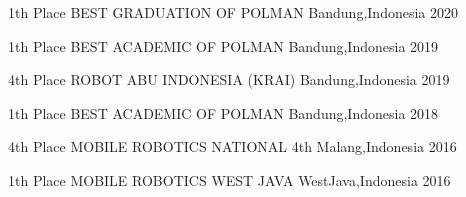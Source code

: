 


\begin{cvhonors}

  \cvhonor
    {1th Place} %
    {BEST GRADUATION OF POLMAN} %
    {Bandung,Indonesia} %
    {2020} %

  \cvhonor
    {1th Place} %
    {BEST ACADEMIC OF POLMAN} %
    {Bandung,Indonesia} %
    {2019} %

  \cvhonor
    {4th Place} %
    {ROBOT ABU INDONESIA (KRAI)} %
    {Bandung,Indonesia} %
    {2019} %

  \cvhonor
    {1th Place} %
    {BEST ACADEMIC OF POLMAN} %
    {Bandung,Indonesia} %
    {2018} %

  \cvhonor
    {4th Place} %
    {MOBILE ROBOTICS NATIONAL 4th} %
    {Malang,Indonesia} %
    {2016} %
    
  \cvhonor
    {1th Place} %
    {MOBILE ROBOTICS WEST JAVA} %
    {WestJava,Indonesia} %
    {2016} %

\end{cvhonors}